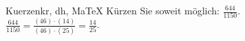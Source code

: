 \begin{MAufgabe}{Kuerzen}{kr, dh, MaTeX}
K\"urzen Sie soweit m\"oglich: $\frac{644}{1150}$.\\ 
\ifLsg\MLoesung
\quad $\frac{644}{1150}=\frac{(46)\cdot(14)}{(46)\cdot(25)}=\frac{14}{25}$.\else\relax\fi
 \end{MAufgabe}